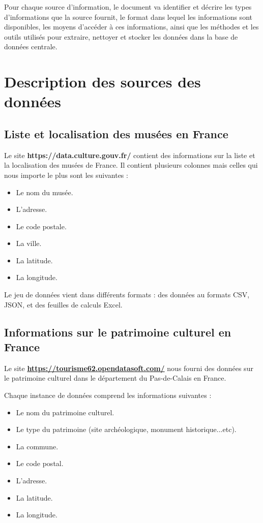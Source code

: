\documentclass[a4paper, 12pt]{article}
\begin{document}
Pour chaque source d'information, le document va identifier et décrire les types d'informations que la source fournit, le format dans lequel les informations sont disponibles, les moyens d'accéder à ces informations, ainsi que les méthodes et les outils utilisés pour extraire, nettoyer et stocker les données dans la base de données centrale.



\section{ Description des sources des données}
 \subsection{Liste et localisation des musées en France}

 Le site  \textbf{https://data.culture.gouv.fr/ }
 contient des informations sur la liste et la localisation des musées de France. Il contient plusieurs colonnes mais celles qui nous importe le plus sont les suivantes : 

 \begin{itemize}
     \item Le nom du musée.
     \item L'adresse.
     \item Le code postale.
     \item La ville.
     \item La latitude.
     \item La longitude.     
 \end{itemize}

Le jeu de données vient dans différents formats : des données au formats CSV, JSON, et des feuilles de calculs Excel.

  
 \subsection{Informations sur le patrimoine culturel en France}

 Le site \href{https://tourisme62.opendatasoft.com/}{\textbf{https://tourisme62.opendatasoft.com/}}
nous fourni des données sur le patrimoine culturel dans le département du Pas-de-Calais en France.  

Chaque instance de données comprend les informations suivantes :

\begin{itemize}
    \item Le nom du patrimoine culturel.
    \item Le type du patrimoine (site archéologique, monument historique...etc).
    \item La commune.
    \item Le code postal.
    \item L'adresse.
    \item La latitude.
    \item La longitude.
\end{itemize}
\end{document}
